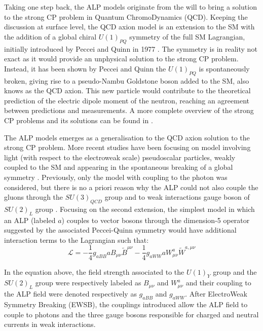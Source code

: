 		Taking one step back, the ALP models originate from the will to bring a solution to the strong CP problem in Quantum ChromoDynamics (QCD). Keeping the discussion at surface level, the QCD axion model is an extension to the SM with the addition of a global chiral $U(1)_{PQ}$ symmetry of the full SM Lagrangian, initially introduced by Peccei and Quinn in 1977 \cite{QCD_axion_PecceiQuinn}. The symmetry is in reality not exact as it would provide an unphysical solution to the strong CP problem. Instead, it has been shown by Peccei and Quinn the $U(1)_{PQ}$ is spontaneously broken, giving rise to a pseudo-Nambu Goldstone boson added to the SM, also knows as the QCD axion. This new particle would contribute to the theoretical prediction of the electric dipole moment of the neutron, reaching an agreement between predictions and measurements. A more complete overview of the strong CP problems and its solutions can be found in \cite{Moretti_MasterThesis}.
		
		The ALP models emerges as a generalisation to the QCD axion solution to the strong CP problem. More recent studies have been focusing on model involving light (with respect to the electroweak scale) pseudoscalar particles, weakly coupled to the SM and appearing in the spontaneous breaking of a global symmetry \cite{ALPs_general}. Previously, only the model with coupling to the photon was considered, but there is no a priori reason why the ALP could not also couple the gluons through the $SU(3)_{QCD}$ group and to weak interactions gauge boson of $SU(2)_L$ group \cite{Moretti_MasterThesis}. Focusing on the second extension, the simplest model in which an ALP (labeled $a$) couples to vector bosons through the dimension-5 operator suggested by the associated Peccei-Quinn symmetry would have additional interaction terms to the Lagrangian such that: 
		\begin{equation}
			\mathcal{L} = -\frac{1}{4} g_{aBB} a B_{\mu\nu} \tilde{B}^{\mu\nu} - \frac{1}{4} g_{aWW} a W_{\mu\nu}^a \tilde{W}^{a,\mu\nu}
		\end{equation} 
		
		In the equation above, the field strength associated to the $U(1)_Y$ group and the $SU(2)_L$ group were respectively labeled as $B_{\mu \nu}$ and $W_{\mu\nu}^a$ and their coupling to the ALP field were denoted respectively as $g_{aBB}$ and $g_{aWW}$. After ElectroWeak Symmetry Breaking (EWSB), the couplings introduced allow the ALP field to couple to photons and the three gauge bosons responsible for charged and neutral currents in weak interactions. 
		
